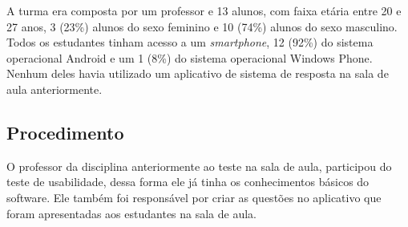A turma era composta por um professor e 13 alunos, com faixa etária entre 20 e 27 anos, 3 (23\%)
alunos do sexo feminino e 10 (74\%) alunos do sexo masculino. Todos os estudantes
tinham acesso a um \textit{smartphone}, 12 (92\%) do sistema operacional Android e um
1 (8\%) do sistema operacional Windows Phone.
Nenhum deles havia utilizado um aplicativo de sistema de resposta na sala de aula anteriormente.

\subsection{Procedimento}

O professor da disciplina anteriormente ao teste na sala de aula, participou do teste de usabilidade,
dessa forma ele já tinha os conhecimentos básicos do software. Ele também foi responsável por criar
as questões no aplicativo que foram apresentadas aos estudantes na sala de aula.
